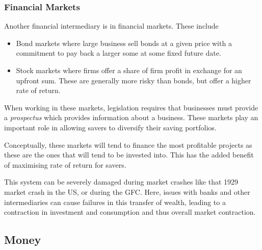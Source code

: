 \documentclass[12pt]{report}
\begin{document}
\begin{flushleft}
\subsubsection*{Financial Markets}

Another financial intermediary is in financial markets. These include
\begin{itemize}
    \item Bond markets where large business sell bonds at a given price with 
        a commitment to pay back a larger some at some fixed future date.
    \item Stock markets where firms offer a share of firm profit in exchange
        for an upfront sum. These are generally more risky than bonds, but
        offer a higher rate of return.
\end{itemize}
When working in these markets, legislation requires that businesses must
provide a \textit{prospectus} which provides information about a business.
These markets play an important role in allowing savers to diversify their
saving portfolios. \par
Conceptually, these markets will tend to finance the most profitable projects
as these are the ones that will tend to be invested into. This has the added
benefit of maximising rate of return for savers. \par
This system can be severely damaged during market crashes like that 1929
market crash in the US, or during the GFC. Here, issues with banks and other
intermediaries can cause failures in this transfer of wealth, leading to a
contraction in investment and consumption and thus overall market contraction.

\subsection*{Money}


\end{flushleft}
\end{document}
